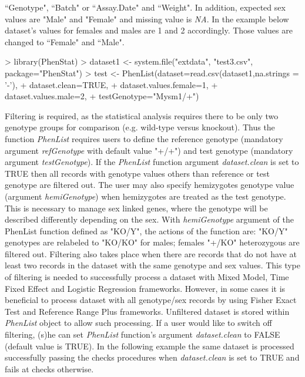 \documentclass[a4paper]{article}
\begin{document}
``Genotype", ``Batch" or ``Assay.Date" and ``Weight". In addition, expected sex values are "Male" and "Female"
and missing value is \textit{NA}.
\newline\newline
In the example below dataset's values for females and males are 1 and 2 accordingly. Those values are changed to
``Female" and ``Male".
\begin{Schunk}
\begin{Sinput}
> library(PhenStat)
> dataset1 <- system.file("extdata", "test3.csv", package="PhenStat")
> test <- PhenList(dataset=read.csv(dataset1,na.strings = '-'),
+                  dataset.clean=TRUE,
+                  dataset.values.female=1,
+                  dataset.values.male=2,
+                  testGenotype="Mysm1/+")
\end{Sinput}
\end{Schunk}
Filtering is required, as the statistical analysis requires there to be only two genotype groups for comparison
(e.g. wild-type versus knockout). Thus the function \textit{PhenList} requires users to define the reference genotype
(mandatory argument \textit{refGenotype} with default value "+\slash+") and test genotype (mandatory argument
\textit{testGenotype}).
If the \textit{PhenList} function argument \textit{dataset.clean} is set to TRUE then all records with genotype
values others than reference or test genotype are filtered out.
The user may also specify hemizygotes genotype value (argument \textit{hemiGenotype}) when hemizygotes are treated as
the test genotype.
This is necessary to manage sex linked genes, where the genotype will be described differently depending on the sex.
\newline\newline
With \textit{hemiGenotype} argument of the PhenList function defined as "KO\slash Y", the actions of the function are:
"KO/Y" genotypes are relabeled to "KO/KO" for males;  females "+\slash KO" heterozygous are filtered out.
\newline\newline
Filtering also takes place when there are records that do not have at least two records in the dataset with the same
genotype and sex values. This type of filtering is needed to successfully process a dataset with Mixed Model,
Time Fixed Effect and Logistic Regression frameworks. However, in some cases it is beneficial to process dataset
with all genotype/sex records by using Fisher Exact Test and Reference Range Plus frameworks.
Unfiltered dataset is stored within \textit{PhenList} object to allow such processing.
\newline\newline
If a user would like to switch off filtering, (s)he can set \textit{PhenList}
function's argument \textit{dataset.clean} to FALSE (default value is TRUE).
In the following example the same dataset is processed successfully passing the checks procedures when
\textit{dataset.clean} is set to TRUE and fails at checks otherwise.
\end{document}
